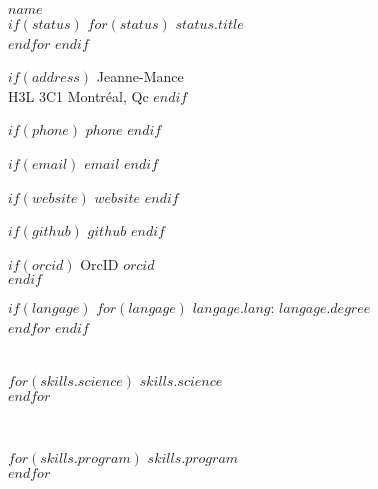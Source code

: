 \documentclass[$fontsize$, letterpaper]{article}
\begin{document}
{\Large \textbf{$name$}}\\[.2cm]
$if(status)$
$for(status)$
{\large{$status.title$}}\\
$endfor$
$endif$

\setlength{\columnsep}{-3cm}
\begin{multicols}{2}

$if(address)$
\faHome {} Jeanne-Mance \\ \hspace*{.6cm} H3L 3C1 Montréal, Qc
$endif$


$if(phone)$
\faPhone \quad $phone$
$endif$


$if(email)$
\faEnvelope \quad \href{mailto:$email$}{$email$}
$endif$


$if(website)$
\faGlobe \quad \href{http://$website$}{$website$}
$endif$


$if(github)$
\faGithub \quad \href{https://github.com/$github$}{$github$}
$endif$


$if(orcid)$
OrcID \quad \href{http://orcid.org/$orcid$}{$orcid$}\\
$endif$

$if(langage)$
$for(langage)$
\textbf{$langage.lang$}: $langage.degree$ \\
$endfor$
$endif$



\columnbreak

\vspace{2cm}

\setlength{\columnsep}{0.1cm}
\begin{multicols}{2}


\\

$for(skills.science)$
$skills.science$\\
$endfor$


\columnbreak

\vspace{-.2cm}

\\

\vspace{-.08cm}

$for(skills.program)$
$skills.program$\\
$endfor$


\end{multicols}
\end{multicols}
\end{document}
